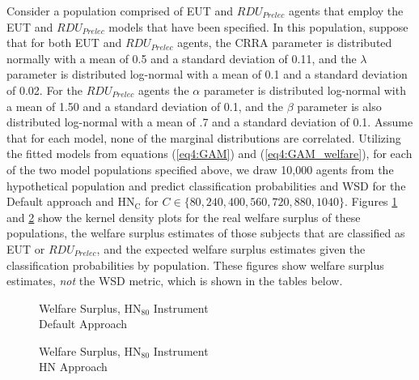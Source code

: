 \documentclass[../main.tex]{subfiles}
\begin{document}
Consider a population comprised of EUT and $\mathit{RDU_{Prelec}}$ agents that employ the EUT and $\mathit{RDU_{Prelec}}$ models that have been specified.
In this population, suppose that for both EUT and $\mathit{RDU_{Prelec}}$ agents, the CRRA parameter is distributed normally with a mean of 0.5 and a standard deviation of 0.11, and the $\lambda$ parameter is distributed log-normal with a mean of 0.1 and a standard deviation of 0.02.
For the $\mathit{RDU_{Prelec}}$ agents the $\alpha$ parameter is distributed log-normal with a mean of 1.50 and a standard deviation of 0.1, and the $\beta$ parameter is also distributed log-normal with a mean of .7 and a standard deviation of 0.1.
Assume that for each model, none of the marginal distributions are correlated.
Utilizing the fitted models from equations (\ref{eq4:GAM}) and (\ref{eq4:GAM_welfare}), for each of the two model populations specified above, we draw 10,000 agents from the hypothetical population and predict classification probabilities and WSD for the Default approach and $\text{HN}_\text{C}$ for $C \in \lbrace 80, 240, 400, 560, 720, 880, 1040 \rbrace$.
Figures \ref{fig:hyp_default} and \ref{fig:hyp_win05} show the kernel density plots for the real welfare surplus of these populations, the welfare surplus estimates of those subjects that are classified as EUT or $\mathit{RDU_{Prelec}}$, and the expected welfare surplus estimates given the classification probabilities by population.
These figures show welfare surplus estimates, \textit{not} the WSD metric, which is shown in the tables below.

\begin{figure}[h!]
	\center
	\caption{Welfare Surplus, $\text{HN}_{80}$ Instrument\\Default Approach}
	\label{fig:hyp_default}
\end{figure}
\begin{figure}[h!]
	\center
	\caption{Welfare Surplus, $\text{HN}_{80}$ Instrument\\HN Approach}
	\label{fig:hyp_win05}
\end{figure}
\end{document}
